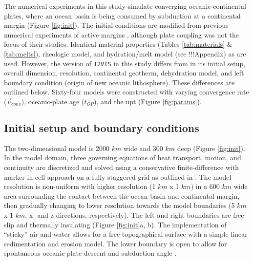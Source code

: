 The numerical experiments in this study simulate converging oceanic-continental plates, where an ocean basin is being consumed by subduction at a continental margin (Figure \ref{fig:init}). The initial conditions are modified from previous numerical experiments of active margins \citep[code: \texttt{I2VIS},][]{Sizova2010, Gorczyk2007}, although plate coupling was not the focus of their studies. Identical material properties (Tables \ref{tab:materials} \& \ref{tab:melts}), rheologic model, and hydration/melt model (see !!!Appendix) as \citet{Sizova2010} are used. However, the version of \texttt{I2VIS} in this study differs from \citet{Sizova2010} in its initial setup, overall dimension, resolution, continental geotherm, dehydration model, and left boundary condition (origin of new oceanic lithosphere). These differences are outlined below. Sixty-four models were constructed with varying convergence rate (\(\vec{v}_{conv}\)), oceanic-plate age (\(t_{OP}\)), and the \gls{upt} (Figure \ref{fig:params}).

\hypertarget{initial-setup-and-boundary-conditions}{%
\subsection{Initial setup and boundary conditions}\label{initial-setup-and-boundary-conditions}}

The two-dimensional model is 2000 \(km\) wide and 300 \(km\) deep (Figure \ref{fig:init}). In the model domain, three governing equations of heat transport, motion, and continuity are discretized and solved using a conservative finite-difference with marker-in-cell approach on a fully staggered grid as outlined in \citet{Gerya2003}. The model resolution is non-uniform with higher resolution (1 \(km\) x 1 \(km\)) in a 600 \(km\) wide area surrounding the contact between the ocean basin and continental margin, then gradually changing to lower resolution towards the model boundaries (5 \(km\) x 1 \(km\), x- and z-directions, respectively). The left and right boundaries are free-slip and thermally insulating (Figure \ref{fig:init}a, b). The implementation of ``sticky'' air and water allows for a free topographical surface with a simple linear sedimentation and erosion model. The lower boundary is open to allow for spontaneous oceanic-plate descent and subduction angle \citep{Burg2005}.

